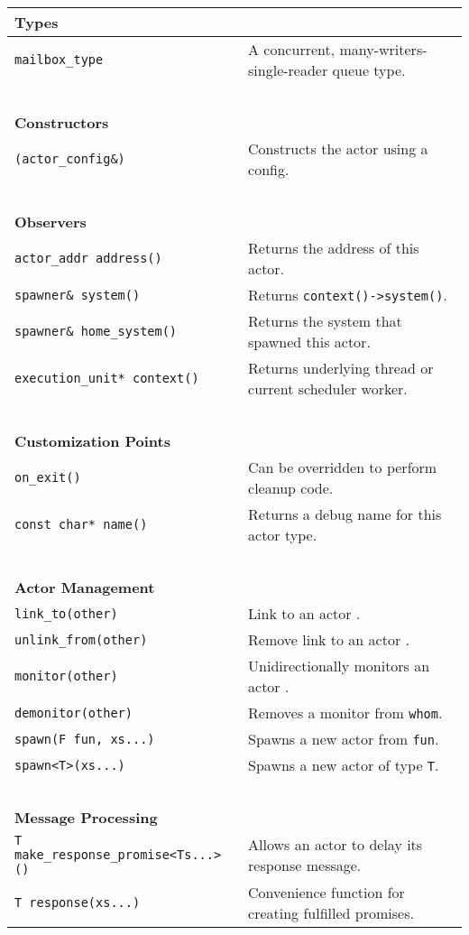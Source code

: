 \begin{center}
\begin{tabular}{ll}
  \textbf{Types} & ~ \\
  \hline
  \lstinline^mailbox_type^ & A concurrent, many-writers-single-reader queue type. \\
  \hline
  ~ & ~ \\ \textbf{Constructors} & ~ \\
  \hline
  \lstinline^(actor_config&)^ & Constructs the actor using a config. \\
  \hline
  ~ & ~ \\ \textbf{Observers} & ~ \\
  \hline
  \lstinline^actor_addr address()^ & Returns the address of this actor. \\
  \hline
  \lstinline^spawner& system()^ & Returns \lstinline^context()->system()^. \\
  \hline
  \lstinline^spawner& home_system()^ & Returns the system that spawned this actor. \\
  \hline
  \lstinline^execution_unit* context()^ & Returns underlying thread or current scheduler worker. \\
  \hline
  ~ & ~ \\ \textbf{Customization Points} & ~ \\
  \hline
  \lstinline^on_exit()^ & Can be overridden to perform cleanup code. \\
  \hline
  \lstinline^const char* name()^ & Returns a debug name for this actor type. \\
  \hline
  ~ & ~ \\ \textbf{Actor Management} & ~ \\
  \hline
  \lstinline^link_to(other)^ & Link to an actor . \\
  \hline
  \lstinline^unlink_from(other)^ & Remove link to an actor . \\
  \hline
  \lstinline^monitor(other)^ & Unidirectionally monitors an actor . \\
  \hline
  \lstinline^demonitor(other)^ & Removes a monitor from \lstinline^whom^. \\
  \hline
  \lstinline^spawn(F fun, xs...)^ & Spawns a new actor from \lstinline^fun^. \\
  \hline
  \lstinline^spawn<T>(xs...)^ & Spawns a new actor of type \lstinline^T^. \\
  \hline
  ~ & ~ \\ \textbf{Message Processing} & ~ \\
  \hline
  \lstinline^T make_response_promise<Ts...>()^ & Allows an actor to delay its response message. \\
  \hline
  \lstinline^T response(xs...)^ & Convenience function for creating fulfilled promises. \\
  \hline
\end{tabular}
\end{center}

